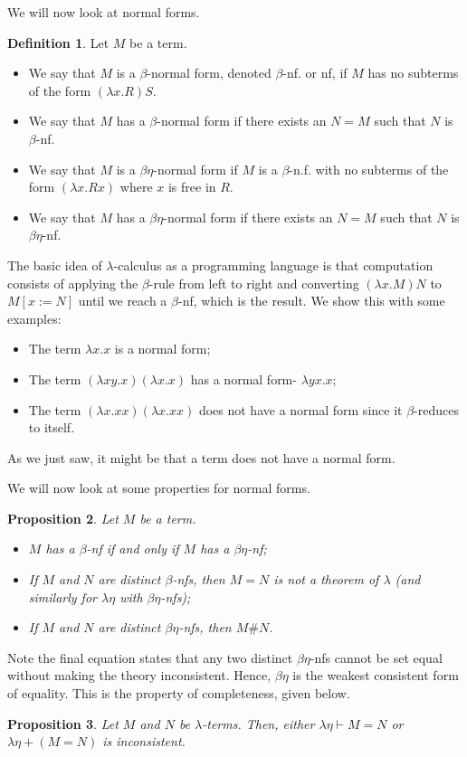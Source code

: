 \documentclass[a4paper, openany]{memoir}
\newtheorem{proposition}{Proposition}[section]
\theoremstyle{definition}
\newtheorem{definition}[proposition]{Definition}
\begin{document}
    We will now look at normal forms.
    \begin{definition}
        Let $M$ be a term.
        \begin{itemize}
            \item We say that $M$ is a $\beta$-normal form, denoted $\beta$-nf. or nf, if $M$ has no subterms of the form $(\lambda x.R)S$.
            \item We say that $M$ has a $\beta$-normal form if there exists an $N = M$ such that $N$ is $\beta$-nf.
            \item We say that $M$ is a $\beta \eta$-normal form if $M$ is a $\beta$-n.f. with no subterms of the form $(\lambda x.Rx)$ where $x$ is free in $R$.
            \item We say that $M$ has a $\beta \eta$-normal form if there exists an $N = M$ such that $N$ is $\beta \eta$-nf.
        \end{itemize}
    \end{definition}
    The basic idea of $\lambda$-calculus as a programming language is that computation consists of applying the $\beta$-rule from left to right and converting $(\lambda x.M)N$ to $M[x := N]$ until we reach a $\beta$-nf, which is the result. We show this with some examples:
    \begin{itemize}
        \item The term $\lambda x.x$ is a normal form;
        \item The term $(\lambda xy.x)(\lambda x.x)$ has a normal form- $\lambda yx.x$;
        \item The term $(\lambda x.xx)(\lambda x.xx)$ does not have a normal form since it $\beta$-reduces to itself.
    \end{itemize}
    As we just saw, it might be that a term does not have a normal form.

    We will now look at some properties for normal forms.
    \begin{proposition}
        Let $M$ be a term.
        \begin{itemize}
            \item $M$ has a $\beta$-nf if and only if $M$ has a $\beta \eta$-nf;
            \item If $M$ and $N$ are distinct $\beta$-nfs, then $M = N$ is not a theorem of $\lambda$ (and similarly for $\lambda \eta$ with $\beta \eta$-nfs);
            \item If $M$ and $N$ are distinct $\beta \eta$-nfs, then $M \# N$.
        \end{itemize}
    \end{proposition}
    \noindent Note the final equation states that any two distinct $\beta \eta$-nfs cannot be set equal without making the theory inconsistent. Hence, $\beta \eta$ is the weakest consistent form of equality. This is the property of completeness, given below.
    \begin{proposition}
        Let $M$ and $N$ be $\lambda$-terms. Then, either $\lambda \eta \vdash M = N$ or $\lambda \eta + (M = N)$ is inconsistent.
    \end{proposition}
    \newpage
\end{document}

